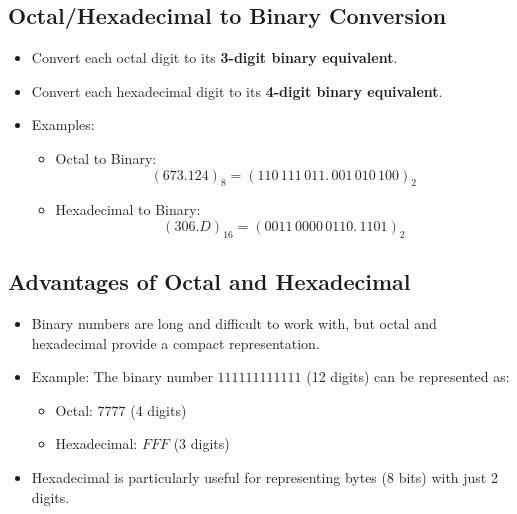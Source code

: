 \documentclass{article}
\begin{document}
	\subsection*{Octal/Hexadecimal to Binary Conversion}
	\begin{itemize}
		\item Convert each octal digit to its \textbf{3-digit binary equivalent}.
		\item Convert each hexadecimal digit to its \textbf{4-digit binary equivalent}.
		\item Examples:
		\begin{itemize}
			\item Octal to Binary:
			\[
			(673.124)_8 = (110\,111\,011.\,001\,010\,100)_2
			\]
			\item Hexadecimal to Binary:
			\[
			(306.D)_{16} = (0011\,0000\,0110.\,1101)_2
			\]
		\end{itemize}
	\end{itemize}
	
	\subsection*{Advantages of Octal and Hexadecimal}
	\begin{itemize}
		\item Binary numbers are long and difficult to work with, but octal and hexadecimal provide a compact representation.
		\item Example: The binary number \(111111111111\) (12 digits) can be represented as:
		\begin{itemize}
			\item Octal: \(7777\) (4 digits)
			\item Hexadecimal: \(FFF\) (3 digits)
		\end{itemize}
		\item Hexadecimal is particularly useful for representing bytes (8 bits) with just 2 digits.
	\end{itemize}
	
\end{document}
